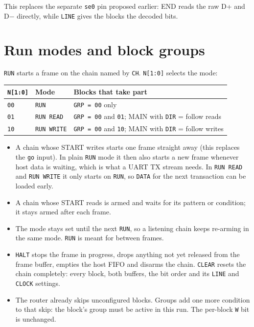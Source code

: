 \documentclass[11pt,a4paper]{article}
\newcommand{\sig}[1]{\texttt{#1}}
\begin{document}
This replaces the separate \sig{se0} pin proposed earlier: END reads the raw D+ and D$-$ directly, while \sig{LINE} gives the blocks the decoded bits.

\section{Run modes and block groups}\label{sec:run}

\sig{RUN} starts a frame on the chain named by \sig{CH}. \sig{N[1:0]} selects the mode:

\begin{center}
\begin{tabular}{@{}lll@{}}
\toprule
\sig{N[1:0]} & Mode & Blocks that take part \\
\midrule
\texttt{00} & \sig{RUN} & \texttt{GRP = 00} only \\
\texttt{01} & \sig{RUN READ} & \texttt{GRP = 00} and \texttt{01}; MAIN with \sig{DIR} = follow reads \\
\texttt{10} & \sig{RUN WRITE} & \texttt{GRP = 00} and \texttt{10}; MAIN with \sig{DIR} = follow writes \\
\bottomrule
\end{tabular}
\end{center}

\begin{itemize}
\item A chain whose START writes starts one frame straight away (this replaces the \sig{go} input). In plain \sig{RUN} mode it then also starts a new frame whenever host data is waiting, which is what a UART TX stream needs. In \sig{RUN READ} and \sig{RUN WRITE} it only starts on \sig{RUN}, so \sig{DATA} for the next transaction can be loaded early.
\item A chain whose START reads is armed and waits for its pattern or condition; it stays armed after each frame.
\item The mode stays set until the next \sig{RUN}, so a listening chain keeps re-arming in the same mode. \sig{RUN} is meant for between frames.
\item \sig{HALT} stops the frame in progress, drops anything not yet released from the frame buffer, empties the host FIFO and disarms the chain. \sig{CLEAR} resets the chain completely: every block, both buffers, the bit order and its \sig{LINE} and \sig{CLOCK} settings.
\item The router already skips unconfigured blocks. Groups add one more condition to that skip: the block's group must be active in this run. The per-block \sig{W} bit is unchanged.
\end{itemize}
\end{document}
